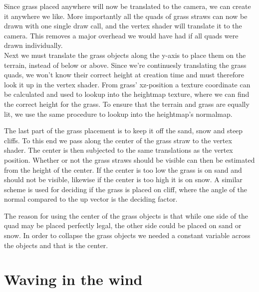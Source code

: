 
Since grass placed anywhere will now be translated to the camera, we
can create it anywhere we like. More importantly all the quads of
grass straws can now be drawn with one single draw call, and the
vertex shader will translate it to the camera. This removes a major
overhead we would have had if all quads were drawn individually. \\


Next we must translate the grass objects along the y-axis to place
them on the terrain, instead of below or above. Since we're
continuesly translating the grass quads, we won't know their correct
height at creation time and must therefore look it up in the vertex
shader. From grass' xz-position a texture coordinate can be calculated
and used to lookup into the heightmap texture, where we can find the
correct height for the grass. To ensure that the terrain and grass are
equally lit, we use the same procedure to lookup into the heightmap's
normalmap.


The last part of the grass placement is to keep it off the sand, snow
and steep cliffs. To this end we pass along the center of the grass
straw to the vertex shader. The center is then subjected to the same
translations as the vertex position. Whether or not the grass straws
should be visible can then be estimated from the height of the
center. If the center is too low the grass is on sand and should not
be visible, likewise if the center is too high it is on snow. A
similar scheme is used for deciding if the grass is placed on cliff,
where the angle of the normal compared to the up vector is the deciding
factor.

The reason for using the center of the grass objects is that while one
side of the quad may be placed perfectly legal, the other side could
be placed on sand or snow. In order to collapse the grass objects we
needed a constant variable across the objects and that is the center.


\section{Waving in the wind}

